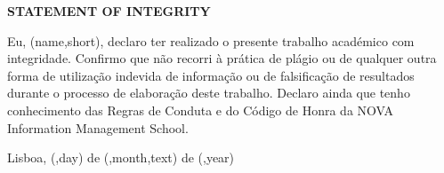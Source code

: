 
%


\begingroup
\setlength{\parskip}{1ex plus 1pt minus 1pt}
\setlength{\parindent}{0cm}
\begin{center}
  \textbf{STATEMENT OF INTEGRITY}
\end{center}

Eu, \thedocauthor(name,short), declaro ter realizado o presente trabalho académico com integridade. 
Confirmo que não recorri à prática de plágio ou de qualquer outra forma de utilização indevida de informação ou de falsificação de resultados durante o processo de elaboração deste trabalho. 
Declaro ainda que tenho conhecimento das Regras de Conduta e do Código de Honra da NOVA Information Management School.

\bigskip


Lisboa, \thentdocdate(\@DATE,day) de \thentdocdate(\@DATE,month,text) de \thentdocdate(\@DATE,year)

\endgroup
\clearforchapter
